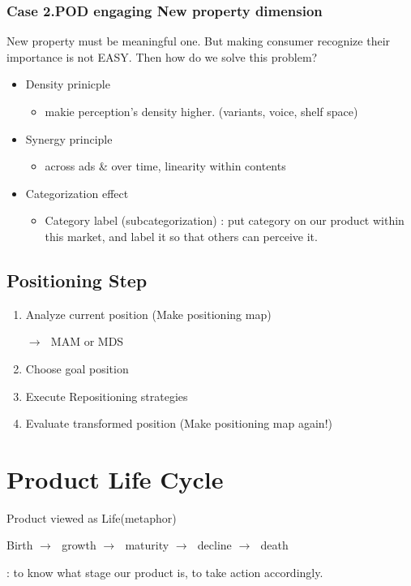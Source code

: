 \documentclass[12pt]{article}
\newcommand{\ra}{$\rightarrow \text{ }$}
\begin{document}
\subsubsection{Case 2.POD engaging New property dimension}
New property must be meaningful one.
But making consumer recognize their importance is not EASY. Then how do we solve this problem?
\begin{itemize}
	\item Density prinicple
	\begin{itemize}
		\item makie perception's density higher. (variants, voice, shelf space)
	\end{itemize}
	\item Synergy principle
	\begin{itemize}
		\item across ads \& over time, linearity within contents
	\end{itemize}
	\item Categorization effect
	\begin{itemize}
		\item Category label (subcategorization) : put category on our product within this market, and label it so that others can perceive it.
	\end{itemize}
\end{itemize}

\subsection{Positioning Step}
\begin{center}
\begin{enumerate}
	\item Analyze  current position (Make positioning map)

	\ra MAM or MDS
	\item Choose goal position
	\item Execute Repositioning strategies
	\item Evaluate transformed position (Make positioning map again!)
\end{enumerate}

\end{center}

\section{Product Life Cycle}
\begin{tcolorbox}
	Product viewed as Life(metaphor)

	Birth \ra growth \ra maturity \ra decline \ra death

\end{tcolorbox}
: {\large to know what stage our product is, to take action accordingly.}
\end{document}
